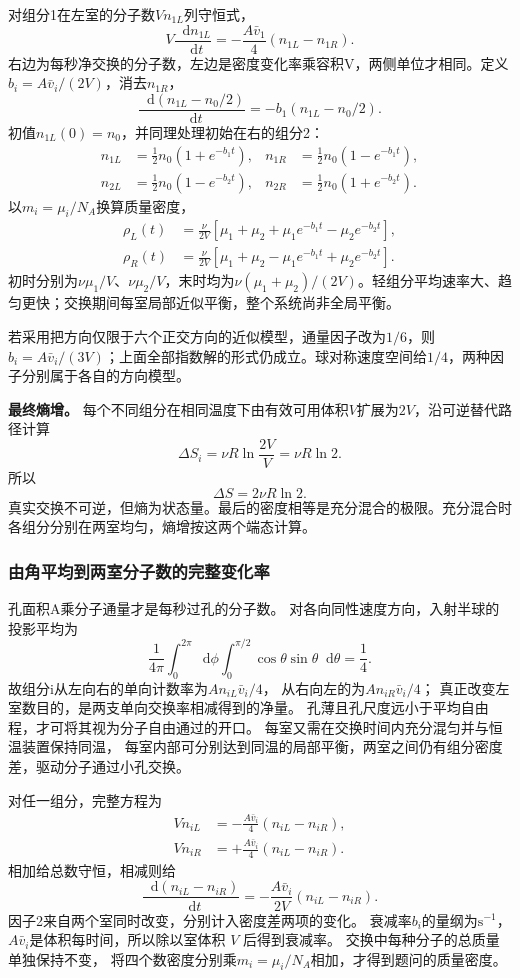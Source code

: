 \documentclass[UTF8,fontset=fandol,a4paper,11pt]{ctexart}
\newcommand{\dd}{\mathop{}\!\mathrm{d}}
\newcommand{\result}[1]{\begin{equation*}\boxed{#1}\end{equation*}}
\begin{document}
对组分1在左室的分子数$Vn_{1L}$列守恒式，
\[V\frac{\dd n_{1L}}{\dd t}=-\frac{A\bar v_1}{4}(n_{1L}-n_{1R}).\]
右边为每秒净交换的分子数，左边是密度变化率乘容积V，两侧单位才相同。定义$b_i=A\bar v_i/(2V)$，消去$n_{1R}$，
\[\frac{\dd(n_{1L}-n_0/2)}{\dd t}=-b_1(n_{1L}-n_0/2).\]
初值$n_{1L}(0)=n_0$，并同理处理初始在右的组分2：
\[\begin{aligned}
n_{1L}&=\tfrac12n_0(1+e^{-b_1t}),&n_{1R}&=\tfrac12n_0(1-e^{-b_1t}),\\
n_{2L}&=\tfrac12n_0(1-e^{-b_2t}),&n_{2R}&=\tfrac12n_0(1+e^{-b_2t}).
\end{aligned}\]
以$m_i=\mu_i/N_A$换算质量密度，
\result{\begin{aligned}
\rho_L(t)&=\frac\nu{2V}[\mu_1+\mu_2+\mu_1e^{-b_1t}-\mu_2e^{-b_2t}],\\
\rho_R(t)&=\frac\nu{2V}[\mu_1+\mu_2-\mu_1e^{-b_1t}+\mu_2e^{-b_2t}].
\end{aligned}}
初时分别为$\nu\mu_1/V$、$\nu\mu_2/V$，末时均为$\nu(\mu_1+\mu_2)/(2V)$。轻组分平均速率大、趋匀更快；交换期间每室局部近似平衡，整个系统尚非全局平衡。

若采用把方向仅限于六个正交方向的近似模型，通量因子改为$1/6$，则$b_i=A\bar v_i/(3V)$；上面全部指数解的形式仍成立。球对称速度空间给$1/4$，两种因子分别属于各自的方向模型。

\textbf{最终熵增。} 每个不同组分在相同温度下由有效可用体积$V$扩展为$2V$，沿可逆替代路径计算
\[\Delta S_i=\nu R\ln\frac{2V}{V}=\nu R\ln2.\]
所以
\result{\Delta S=2\nu R\ln2.}
真实交换不可逆，但熵为状态量。最后的密度相等是充分混合的极限。充分混合时各组分分别在两室均匀，熵增按这两个端态计算。
\subsubsection*{由角平均到两室分子数的完整变化率}
孔面积A乘分子通量才是每秒过孔的分子数。
对各向同性速度方向，入射半球的投影平均为
\[
\frac1{4\pi}\int_0^{2\pi}\dd\phi
\int_0^{\pi/2}\cos\theta\sin\theta\dd\theta=\frac14.
\]
故组分i从左向右的单向计数率为$An_{iL}\bar v_i/4$，
从右向左的为$An_{iR}\bar v_i/4$；
真正改变左室数目的，是两支单向交换率相减得到的净量。
孔薄且孔尺度远小于平均自由程，才可将其视为分子自由通过的开口。
每室又需在交换时间内充分混匀并与恒温装置保持同温，
每室内部可分别达到同温的局部平衡，两室之间仍有组分密度差，驱动分子通过小孔交换。

对任一组分，完整方程为
\[
\begin{aligned}
V\dot n_{iL}&=-\frac{A\bar v_i}{4}(n_{iL}-n_{iR}),\\
V\dot n_{iR}&=+\frac{A\bar v_i}{4}(n_{iL}-n_{iR}).
\end{aligned}
\]
相加给总数守恒，相减则给
\[
\frac{\dd(n_{iL}-n_{iR})}{\dd t}
=-\frac{A\bar v_i}{2V}(n_{iL}-n_{iR}).
\]
因子2来自两个室同时改变，分别计入密度差两项的变化。
衰减率$b_i$的量纲为$\mathrm{s^{-1}}$，
$A\bar v_i$是体积每时间，所以除以室体积 $V$ 后得到衰减率。
交换中每种分子的总质量单独保持不变，
将四个数密度分别乘$m_i=\mu_i/N_A$相加，才得到题问的质量密度。
\end{document}
